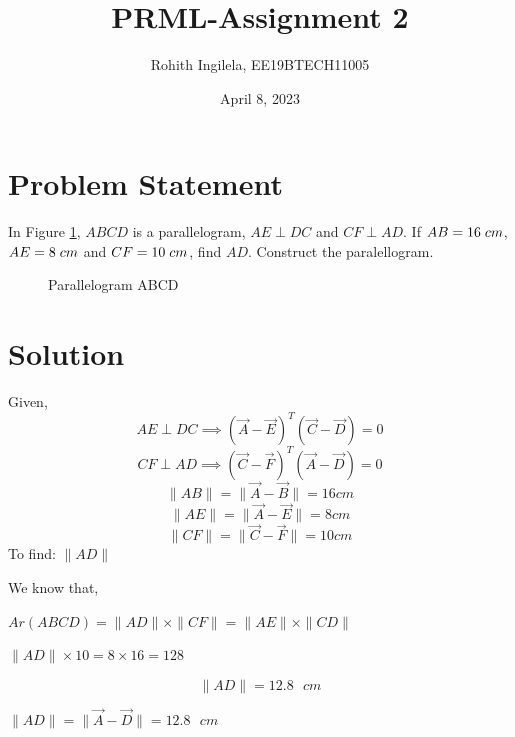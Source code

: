\documentclass[letterpaper,12pt]{article}
\title{PRML-Assignment 2}
\author{Rohith Ingilela,  EE19BTECH11005 }
\date{April 8, 2023}
\begin{document}
\maketitle

\section{Problem Statement}

In Figure \ref*{fig:fig1}, $ABCD$ is a parallelogram, $AE \perp DC$
and $CF \perp AD$. If $AB = 16 \hspace{0.1cm} cm$, $AE = 8 \hspace{0.1cm} cm$ and
$CF = 10 \hspace{0.1cm} cm$, find $AD$. Construct the paralellogram.

\begin{figure}[!ht]
\centering


\caption{Parallelogram ABCD}
\label{fig:fig1}
\end{figure}
\section{Solution}

Given,
\begin{equation}
    AE \perp DC \implies (\Vec{A} - \Vec{E})^T (\Vec{C} - \Vec{D}) = 0
\end{equation}
\begin{equation}
    CF \perp AD \implies (\Vec{C} - \Vec{F})^T (\Vec{A} - \Vec{D}) = 0
\end{equation}
\begin{equation}
    \|AB\| = \|\Vec{A} - \Vec{B}\| = 16 cm
\end{equation}
\begin{equation}
    \|AE\| = \|\Vec{A} - \Vec{E}\| = 8 cm
\end{equation}
\begin{equation}
    \|CF\| = \|\Vec{C} - \Vec{F}\| = 10 cm
\end{equation}
To find: $\|AD\|$

\clearpage
We know that,
\begin{center}
    $Ar(ABCD) = \|AD\|\times\|CF\| = \|AE\|\times\|CD\|$ \\
\end{center}
\begin{center}
    $\|AD\| \times 10 = 8 \times 16 = 128$
\end{center}
\begin{equation}
    \|AD\| = 12.8 \text{ } cm
\end{equation}
\begin{center}
    $\|AD\| = \|\Vec{A} - \Vec{D}\| = 12.8 \text{ } cm$
\end{center}
\end{document}
